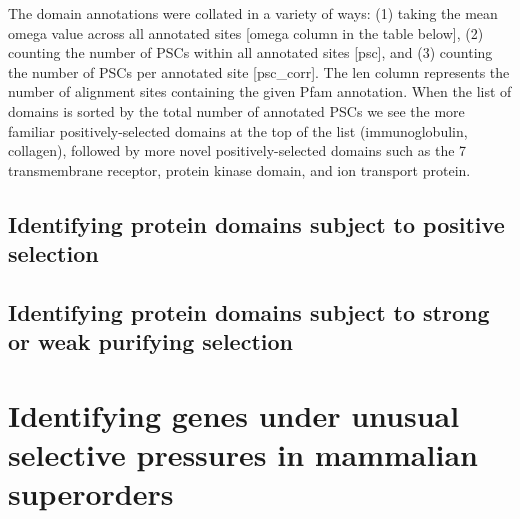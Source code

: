 The domain annotations were collated in a variety of ways: (1) taking
the mean omega value across all annotated sites [omega column in the
  table below], (2) counting the number of PSCs within all annotated
sites [psc], and (3) counting the number of PSCs per annotated site
[psc\_corr]. The len column represents the number of alignment sites
containing the given Pfam annotation. When the list of domains is
sorted by the total number of annotated PSCs we see the more familiar
positively-selected domains at the top of the list (immunoglobulin,
collagen), followed by more novel positively-selected domains such as
the 7 transmembrane receptor, protein kinase domain, and ion transport
protein.

\subsection{Identifying protein domains subject to positive selection}
\subsection{Identifying protein domains subject to strong or weak purifying selection}

\section{Identifying genes under unusual selective pressures in mammalian superorders}

